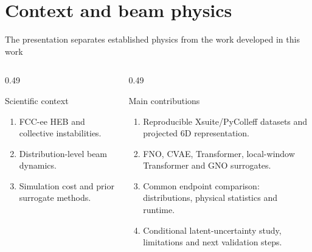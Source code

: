 \section{Context and beam physics}
\begin{frame}[t,shrink=5]{The presentation separates established physics from the work developed in this work}
\begin{columns}[T,onlytextwidth]
\begin{column}{0.49\textwidth}
\begin{block}{Scientific context}
\begin{enumerate}
\item FCC-ee HEB and collective instabilities.
\item Distribution-level beam dynamics.
\item Simulation cost and prior surrogate methods.
\end{enumerate}
\end{block}

\end{column}
\begin{column}{0.49\textwidth}
\begin{block}{Main contributions}
\begin{enumerate}
\item Reproducible Xsuite/PyColleff datasets and projected 6D representation.
\item FNO, CVAE, Transformer, local-window Transformer and GNO surrogates.
\item Common endpoint comparison: distributions, physical statistics and runtime.
\item Conditional latent-uncertainty study, limitations and next validation steps.
\end{enumerate}
\end{block}

\end{column}
\end{columns}


\end{frame}

